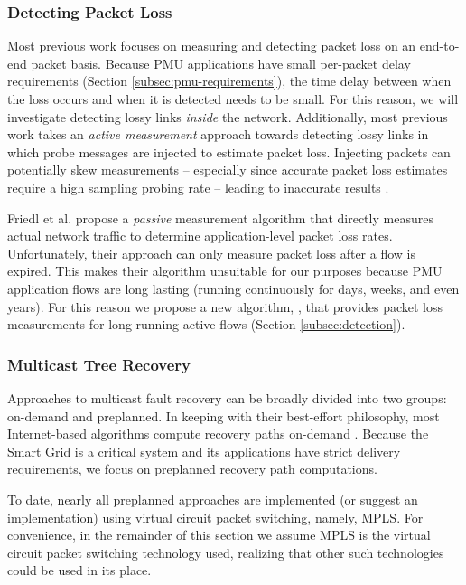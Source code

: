 \subsubsection{Detecting Packet Loss} 

Most previous work \cite{??} focuses on measuring and detecting packet loss on an end-to-end packet basis.
Because PMU applications have small per-packet delay requirements (Section \ref{subsec:pmu-requirements}), the time delay between when the loss occurs and when it is detected needs to be small.  
For this reason, we will investigate detecting lossy links \emph{inside} the network. 
Additionally, most previous work takes an \emph{active measurement} approach towards detecting lossy links in which probe messages are injected to estimate packet loss.  Injecting packets can
potentially skew measurements -- especially since accurate packet loss estimates require a high sampling probing rate -- leading to inaccurate results \cite{Barford04}. 


Friedl et al. \cite{Friedl09} propose a \emph{passive} measurement algorithm that directly measures actual network traffic to determine application-level packet loss rates. 
Unfortunately, their approach can only measure packet loss after a flow is expired.  This makes their algorithm unsuitable for our purposes because
PMU application flows are long lasting (running continuously for days, weeks, and even years). 
For this reason we propose a new algorithm, \fls, that provides packet loss measurements for long running active flows (Section \ref{subsec:detection}).



\subsubsection{Multicast Tree Recovery}

Approaches to multicast fault recovery can be broadly divided into two groups: on-demand and preplanned. 
In keeping with their best-effort philosophy, most Internet-based algorithms compute recovery paths on-demand \cite{Cui04}. 
Because the Smart Grid is a critical system and its applications have strict delivery requirements, we focus on preplanned recovery path computations.
 
To date, nearly all preplanned approaches \cite{Cui04,Fei01,Medard99,Pointurier02,Wu97} are implemented (or suggest an implementation) using 
virtual circuit packet switching, namely, MPLS. For convenience, in the remainder of this section
we assume MPLS is the virtual circuit packet switching technology used, realizing that other such technologies could be used in its place.

